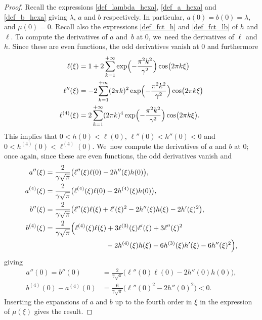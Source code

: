 \documentclass[10pt]{amsart}
\theoremstyle{definition}
\let\EE\exp
\newcommand{\bpa}[1]{\bigl(#1\bigr)}
\begin{document}
\begin{proof}
Recall the expressions \eqref{def_lambda_hexa}, \eqref{def_a_hexa} and \eqref{def_b_hexa} giving $\lambda$, $a$ and $b$ respectively. In particular, $a(0) = b(0) = \lambda$, and $\mu(0) = 0$. Recall also the expressions \eqref{def_fct_h} and \eqref{def_fct_lb} of $h$ and $\ell$. To compute the derivatives of $a$ and~$b$ at $0$, we~need the derivatives of $\ell$ and $h$. Since these are even functions, the odd derivatives vanish at $0$ and furthermore
\begin{align*}
\ell(\xi) &= 1 + 2\sum_{k=1}^{+\infty} \EE\Bigl(-\frac{\pi^2k^2}{\gamma^2}\Bigr) \cos\bigl({2\pi k \xi} \bigr) \\
\ell''(\xi) &= -2\sum_{k=1}^{+\infty} (2\pi k)^2\EE\Bigl(-\frac{\pi^2k^2}{\gamma^2}\Bigr) \cos\bigl({2\pi k \xi} \bigr) \\
\ell^{(4)}(\xi) &= 2\sum_{k=1}^{+\infty} (2\pi k)^4\EE\Bigl(-\frac{\pi^2k^2}{\gamma^2}\Bigr) \cos\bigl({2\pi k \xi} \bigr).
\end{align*}
This implies that $0< h(0) < \ell(0)$, $\ell''(0) < h''(0) < 0$ and $0 < h^{(4)}(0) < \ell^{(4)}(0)$. We~now compute the derivatives of $a$ and $b$ at $0$; once again, since these are even functions, the odd derivatives vanish and
\begin{align*}
a''(\xi) &= \frac{2}{\gamma\sqrt{\pi}} \bpa{\ell''(\xi)\ell(0)-2h''(\xi)h(0)}, \\
a^{(4)}(\xi) &= \frac{2}{\gamma\sqrt{\pi}} \bpa{\ell^{(4)}(\xi)\ell(0)-2h^{(4)}(\xi)h(0)}, \\
b''(\xi) &= \frac{2}{\gamma\sqrt{\pi}} \bpa{\ell''(\xi)\ell(\xi)+\ell'(\xi)^2-2h''(\xi)h(\xi)-2h'(\xi)^2},\\
b^{(4)}(\xi) &= \frac{2}{\gamma\sqrt{\pi}} \Bigl(\ell^{(4)}(\xi)\ell(\xi)+3\ell^{(3)}(\xi)\ell'(\xi)+3\ell''(\xi)^2 \\
&\hspace*{3cm}-2h^{(4)}(\xi)h(\xi)-6h^{(3)}(\xi)h'(\xi)-6h''(\xi)^2\Bigr),
\end{align*}
giving
\begin{align*}
a''(0) = b''(0) &= \frac{2}{\gamma\sqrt{\pi}} \bigl(\ell''(0)\ell(0)-2h''(0)h(0)\bigr), \\
b^{(4)}(0) - a^{(4)}(0) &= \frac{6}{\gamma\sqrt{\pi}} \bigl(\ell''(0)^2 - 2h''(0)^2\bigr) < 0.
\end{align*}
Inserting the expansions of $a$ and $b$ up to the fourth order in $\xi$ in the expression of $\mu(\xi)$ gives the result.
\end{proof}
\end{document}

